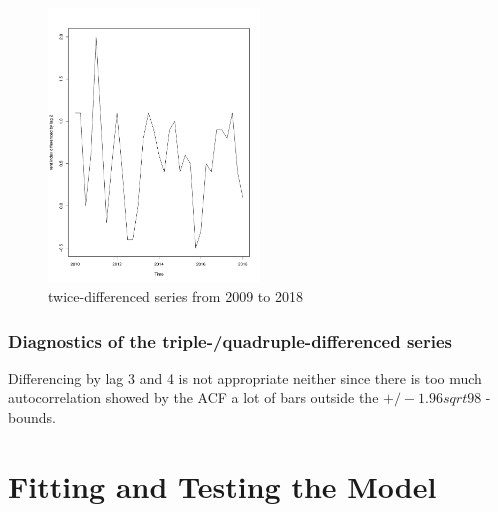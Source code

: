 \documentclass[11pt,a4paper]{article}
\begin{document}
\begin{figure}[!htb]
\centering
\includegraphics[angle=0,
width=0.5\textwidth]{diff2_testset}
\caption{twice-differenced series from 2009 to 2018
\label{fig:diff2_testset}}
\end{figure} 

\subsubsection{Diagnostics of the triple-/quadruple-differenced series}
Differencing by lag 3 and 4 is not appropriate neither since there is too much autocorrelation showed by the ACF a lot of bars outside the $+/-1.96sqrt{98}$ - bounds.


\section{Fitting and Testing the Model}
\end{document}
